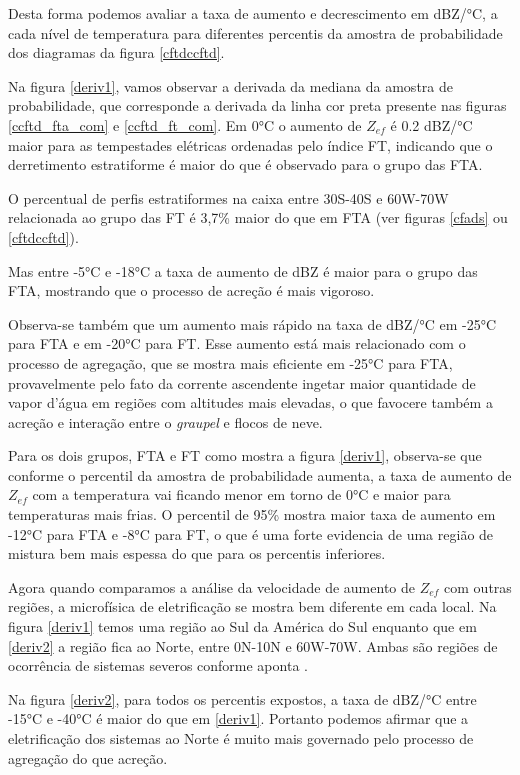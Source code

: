 \documentclass[preprint,authoryear,3p]{elsarticle}
\begin{document}
\begin{multicols}{2}
Desta forma podemos avaliar a taxa de aumento e decrescimento em dBZ/°C, a cada nível de temperatura para diferentes percentis da amostra de probabilidade dos diagramas da figura \ref{cftdccftd}.

Na figura \ref{deriv1}, vamos observar a derivada da mediana da amostra de probabilidade, que corresponde a derivada da linha cor preta presente nas figuras \ref{ccftd_fta_com} e \ref{ccftd_ft_com}. Em 0°C o aumento de $Z_{ef}$ é 0.2 dBZ/°C maior para as tempestades elétricas ordenadas pelo índice FT, indicando que o derretimento estratiforme é maior do que é observado para o grupo das FTA.

O percentual de perfis estratiformes na caixa entre  30S-40S e 60W-70W relacionada ao grupo das FT é 3,7\% maior do que em FTA (ver figuras \ref{cfads} ou \ref{cftdccftd}).  

Mas entre -5°C e -18°C a taxa de aumento de dBZ é maior para o grupo das FTA, mostrando que o processo de acreção é mais vigoroso. 

Observa-se também que um aumento mais rápido na taxa de dBZ/°C em -25°C para FTA e em -20°C para FT. Esse aumento está mais relacionado com o processo de agregação, que se mostra mais eficiente em -25°C para FTA, provavelmente pelo fato da corrente ascendente ingetar maior quantidade de vapor d'água em regiões com altitudes mais elevadas, o que favocere também a acreção e interação entre o \textit{graupel} e flocos de neve. 

Para os dois grupos, FTA e FT como mostra a figura \ref{deriv1}, observa-se que conforme o percentil da amostra de probabilidade aumenta, a taxa de aumento de $Z_{ef}$ com a temperatura vai ficando menor em torno de 0°C e maior para temperaturas mais frias. O percentil de 95\% mostra maior taxa de aumento em -12°C para FTA e -8°C para FT, o que é uma forte evidencia de uma região de mistura bem mais espessa do que para os percentis inferiores. 

Agora quando comparamos a análise da velocidade de aumento de $Z_{ef}$ com outras regiões, a microfísica de eletrificação se mostra bem diferente em cada local. Na figura \ref{deriv1} temos uma região ao Sul da América do Sul enquanto que em \ref{deriv2} a região fica ao Norte, entre 0N-10N e 60W-70W. Ambas são regiões de ocorrência de sistemas severos conforme aponta \cite{cecil2005}.	 

Na figura \ref{deriv2}, para todos os percentis expostos, a taxa de dBZ/°C entre -15°C e -40°C é maior do que em \ref{deriv1}. Portanto podemos afirmar que a eletrificação dos sistemas ao Norte é muito mais governado pelo processo de agregação do que acreção. 


\end{multicols}
\end{document}
